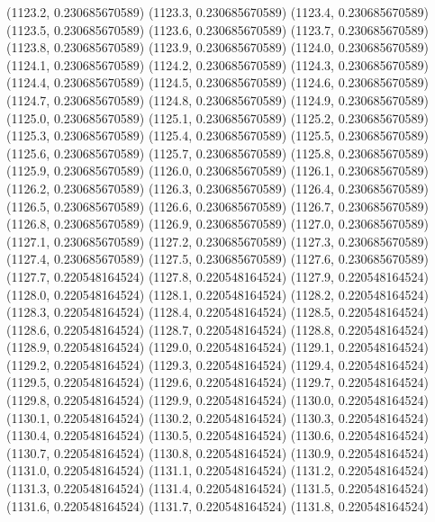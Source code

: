 {					(1123.2, 0.230685670589)
					(1123.3, 0.230685670589)
					(1123.4, 0.230685670589)
					(1123.5, 0.230685670589)
					(1123.6, 0.230685670589)
					(1123.7, 0.230685670589)
					(1123.8, 0.230685670589)
					(1123.9, 0.230685670589)
					(1124.0, 0.230685670589)
					(1124.1, 0.230685670589)
					(1124.2, 0.230685670589)
					(1124.3, 0.230685670589)
					(1124.4, 0.230685670589)
					(1124.5, 0.230685670589)
					(1124.6, 0.230685670589)
					(1124.7, 0.230685670589)
					(1124.8, 0.230685670589)
					(1124.9, 0.230685670589)
					(1125.0, 0.230685670589)
					(1125.1, 0.230685670589)
					(1125.2, 0.230685670589)
					(1125.3, 0.230685670589)
					(1125.4, 0.230685670589)
					(1125.5, 0.230685670589)
					(1125.6, 0.230685670589)
					(1125.7, 0.230685670589)
					(1125.8, 0.230685670589)
					(1125.9, 0.230685670589)
					(1126.0, 0.230685670589)
					(1126.1, 0.230685670589)
					(1126.2, 0.230685670589)
					(1126.3, 0.230685670589)
					(1126.4, 0.230685670589)
					(1126.5, 0.230685670589)
					(1126.6, 0.230685670589)
					(1126.7, 0.230685670589)
					(1126.8, 0.230685670589)
					(1126.9, 0.230685670589)
					(1127.0, 0.230685670589)
					(1127.1, 0.230685670589)
					(1127.2, 0.230685670589)
					(1127.3, 0.230685670589)
					(1127.4, 0.230685670589)
					(1127.5, 0.230685670589)
					(1127.6, 0.230685670589)
					(1127.7, 0.220548164524)
					(1127.8, 0.220548164524)
					(1127.9, 0.220548164524)
					(1128.0, 0.220548164524)
					(1128.1, 0.220548164524)
					(1128.2, 0.220548164524)
					(1128.3, 0.220548164524)
					(1128.4, 0.220548164524)
					(1128.5, 0.220548164524)
					(1128.6, 0.220548164524)
					(1128.7, 0.220548164524)
					(1128.8, 0.220548164524)
					(1128.9, 0.220548164524)
					(1129.0, 0.220548164524)
					(1129.1, 0.220548164524)
					(1129.2, 0.220548164524)
					(1129.3, 0.220548164524)
					(1129.4, 0.220548164524)
					(1129.5, 0.220548164524)
					(1129.6, 0.220548164524)
					(1129.7, 0.220548164524)
					(1129.8, 0.220548164524)
					(1129.9, 0.220548164524)
					(1130.0, 0.220548164524)
					(1130.1, 0.220548164524)
					(1130.2, 0.220548164524)
					(1130.3, 0.220548164524)
					(1130.4, 0.220548164524)
					(1130.5, 0.220548164524)
					(1130.6, 0.220548164524)
					(1130.7, 0.220548164524)
					(1130.8, 0.220548164524)
					(1130.9, 0.220548164524)
					(1131.0, 0.220548164524)
					(1131.1, 0.220548164524)
					(1131.2, 0.220548164524)
					(1131.3, 0.220548164524)
					(1131.4, 0.220548164524)
					(1131.5, 0.220548164524)
					(1131.6, 0.220548164524)
					(1131.7, 0.220548164524)
					(1131.8, 0.220548164524)
}

